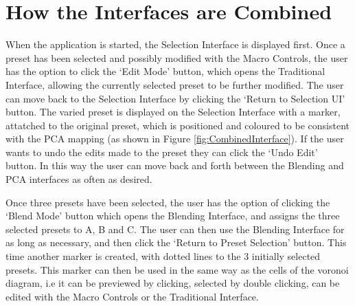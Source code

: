 \documentclass[11pt, oneside]{report}   	%
\begin{document}
\section{How the Interfaces are Combined}
When the application is started, the Selection Interface is displayed first. Once a preset has been selected and possibly modified with the Macro Controls, the user has the option to click the `Edit Mode' button, which opens the Traditional Interface, allowing the currently selected preset to be further modified. The user can move back to the Selection Interface by clicking the `Return to Selection UI' button. The varied preset is displayed on the Selection Interface with a marker, attatched to the original preset, which is positioned and coloured to be consistent with the PCA mapping (as shown in Figure \ref{fig:CombinedInterface}). If the user wants to undo the edits made to the preset they can click the `Undo Edit' button. In this way the user can move back and forth between the Blending and PCA interfaces as often as desired.

Once three presets have been selected, the user has the option of clicking the `Blend Mode' button which opens the Blending Interface, and assigns the three selected presets to A, B and C. The user can then use the Blending Interface for as long as necessary, and then click the `Return to Preset Selection' button. This time another marker is created, with dotted lines to the 3 initially selected presets. 
This marker can then be used in the same way as the cells of the voronoi diagram, i.e it can be previewed by clicking, selected by double clicking, can be edited with the Macro Controls or the Traditional Interface.
\end{document}
